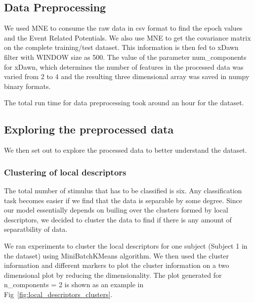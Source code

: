 \documentclass[final,leqno,onefignum,onetabnum]{siamltexmm}
\begin{document}
\subsection{Data Preprocessing}

We used MNE to consume the raw data in csv format to find the epoch values and the Event Related Potentials.  
We also use MNE to get the covariance matrix on the complete training/test dataset.  
This information is then fed to xDawn filter with WINDOW size as 500.  
The value of the parameter num\_components for xDawn, which determines the number of features in the processed data was varied from 2 to 4 and the resulting three dimensional array was saved in numpy binary formats.

The total run time for data preprocessing took around an hour for the dataset.

\subsection{Exploring the preprocessed data}
We then set out to explore the processed data to better understand the dataset.
\subsubsection{Clustering of local descriptors}
The total number of stimulus that has to be classified is six.  
Any classification task becomes easier if we find that the data is separable by some degree.  
Since our model essentially depends on builing over the clusters formed by local descriptors, we decided to cluster the data to find if there is any amount of separatbility of data.

We ran experiments to cluster the local descriptors for one subject (Subject 1 in the dataset) using MiniBatchKMeans algorithm.  
We then used the cluster information and different markers to plot the cluster information on a two dimensional plot by reducing the dimensionality.
The plot generated for n\_components = 2 is shown as an example in Fig~\ref{fig:local_descriptors_clusters}.
\end{document}

